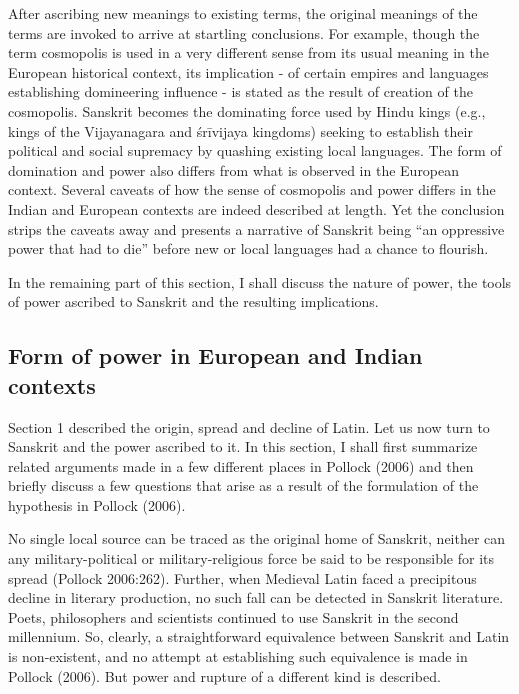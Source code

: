 After ascribing new meanings to existing terms, the original meanings of the terms are invoked to arrive at startling conclusions. For example, though the term cosmopolis is used in a very different sense from its usual meaning in the European historical context, its implication - of certain empires and languages establishing domineering influence - is stated as the result of creation of the cosmopolis. Sanskrit becomes the dominating force used by Hindu kings (e.g., kings of the Vijayanagara and śrīvijaya kingdoms) seeking to establish their political and social supremacy by quashing existing local languages. The form of domination and power also differs from what is observed in the European context. Several caveats of how the sense of cosmopolis and power differs in the Indian and European contexts are indeed described at length. Yet the conclusion strips the caveats away and presents a narrative of Sanskrit being “an oppressive power that had to die” before new or local languages had a chance to flourish.

In the remaining part of this section, I shall discuss the nature of power, the tools of power ascribed to Sanskrit and the resulting implications.
\newpage


\subsection{Form of power in European and Indian contexts}
\vskip -4pt

Section 1 described the origin, spread and decline of Latin. Let us now turn to Sanskrit and the power ascribed to it. In this section, I shall first summarize related arguments made in a few different places in Pollock (2006) and then briefly discuss a few questions that arise as a result of the formulation of the hypothesis in Pollock (2006). 

No single local source can be traced as the original home of Sanskrit, neither can any military-political or military-religious force be said to be responsible for its spread (Pollock 2006:262). Further, when Medieval Latin faced a precipitous decline in literary production, no such fall can be detected in Sanskrit literature. Poets, philosophers and scientists continued to use Sanskrit in the second millennium. So, clearly, a straightforward equivalence between Sanskrit and Latin is non-existent, and no attempt at establishing such equivalence is made in Pollock (2006). But power and rupture of a different kind is described.

